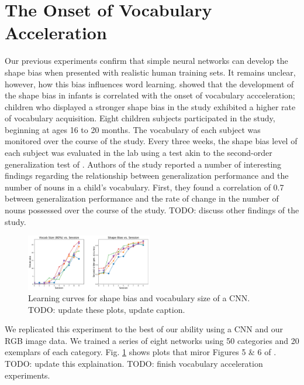 \section{The Onset of Vocabulary Acceleration}
\label{sec:vocab_accel}
Our previous experiments confirm that simple neural networks can develop the shape
bias when presented with realistic human training sets. It remains unclear,
however, how this bias influences word learning. \cite{GershkoffStowe2004}
showed that the development of the shape bias in infants is correlated with the
onset of vocabulary accceleration; children who displayed a stronger shape bias
in the study exhibited a higher rate of vocabulary acquisition. Eight children subjects
participated in the study, beginning at ages 16 to 20 months. The vocabulary
of each subject was monitored over the course of the study. Every three weeks,
the shape bias level of each subject was evaluated in the lab using a test
akin to the second-order generalization test of \cite{Smith2002}. Authors of the
study reported a number of interesting findings regarding the relationship between
generalization performance and the number of nouns in a child's vocabulary. First,
they found a correlation of 0.7 between generalization performance and the rate of
change in the number of nouns possessed over the course of the study. TODO:
discuss other findings of the study.

\begin{figure}[t!]
    \begin{center}
        \includegraphics[width=0.49\textwidth]{figures/shapebias_and_vocab.pdf}
    \end{center}
    \caption{Learning curves for shape bias and vocabulary size of a CNN. TODO:
    update these plots, update caption.}
    \label{fig:learning_curves}
\end{figure}

We replicated this experiment to the best of our ability using a CNN and our
RGB image data. We trained a series of eight networks using 50 categories and
20 exemplars of each category. Fig. \ref{fig:learning_curves} shows plots that
miror Figures 5 \& 6 of \cite{GershkoffStowe2004}. TODO: update this explaination.
TODO: finish vocabulary acceleration experiments.